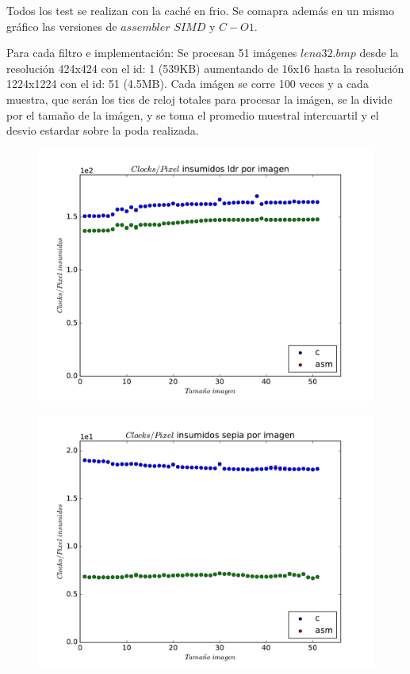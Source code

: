 Todos los test se realizan con la caché en frio. Se comapra además en un mismo gráfico las versiones de $assembler$ $SIMD$ y $C-O1$.

Para cada filtro e implementación: Se procesan 51 imágenes $lena32.bmp$ desde la resolución 424x424 con el id: 1 (539KB) aumentando de 16x16 hasta la resolución 1224x1224 con el id: 51 (4.5MB). Cada imágen se corre 100 veces y a cada muestra, que serán los tics de reloj totales para procesar la imágen, se la divide por el tamaño de la imágen, y se toma el promedio muestral intercuartil y el desvio estardar sobre la poda realizada.
 
\begin{figure}
  \begin{center}
	\includegraphics[scale=0.5]{ldrall.pdf}
  \end{center}
\end{figure}

\begin{figure}
  \begin{center}
	\includegraphics[scale=0.5]{sepiaall.pdf}
  \end{center}
\end{figure}

